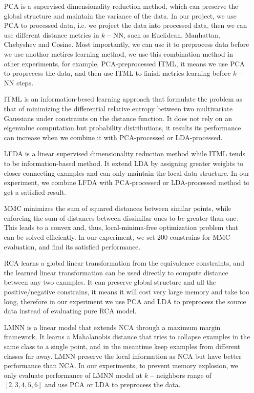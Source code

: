 \documentclass[conference]{IEEEtran}
\begin{document}
PCA is a supervised dimensionality reduction method, which can preserve the global structure and maintain the variance of the data. In our project, we use PCA to processed data, i.e. we project the data into processed data, then we can use different distance metrics in $k-$NN, such as Euclidean, Manhattan, Chebyshev and Cosine. Most importantly, we can use it to preprocess data before we use anothor metircs learning method, we use this combination method in other experiments, for example, PCA-preprocessed ITML, it means we use PCA to proprecess the data, and then use ITML to finish metrics learning before $k-$NN steps.

ITML is an information-besed learning approach that formulate the problem as that of minimizing the differential relative entropy between two multivariate Gaussians under constraints on the distance function\cite{Davis2007Information}. It does not rely on an eigenvalue computation but probability distributions, it results its performance can increase when we combine it with PCA-processed or LDA-processed.

LFDA is a linear supervised dimensionality reduction method while ITML tends to be information-based method. It extend LDA by assigning greater weights to closer connecting examples and can only maintain the local data structure. In our experiment, we combine LFDA with PCA-processed or LDA-processed method to get a satisfied result.

MMC minimizes the sum of squared distances between similar points, while enforcing the sum of distances between dissimilar ones to be greater than one. This leads to a convex and, thus, local-minima-free optimization problem that can be solved efficiently. In our experiment, we set 200 constrains for MMC evaluation, and find its satisfied performance.

RCA learns a global linear transformation from the equivalence constraints, and the learned linear transformation can be used directly to compute distance between any two examples. It can preserve global structure and all the positive/negative constrains, it means it will cost very large memory and take too long, therefore in our experiment we use PCA and LDA to preprocess the source data instead of evaluating pure RCA model.

LMNN is a linear model that extends NCA through a maximum margin framework. It learns a Mahalanobis distance that tries to collapse examples in the same class to a single point, and in the meantime keep examples from different classes far away. LMNN preserve the local information as NCA but have better performance than NCA. In our experiments, to prevent memory explosion, we only evaluate performance of LMNN model at $k-$neighbors range of $[2,3,4,5,6]$ and use PCA or LDA to preprocess the data.
\end{document}
